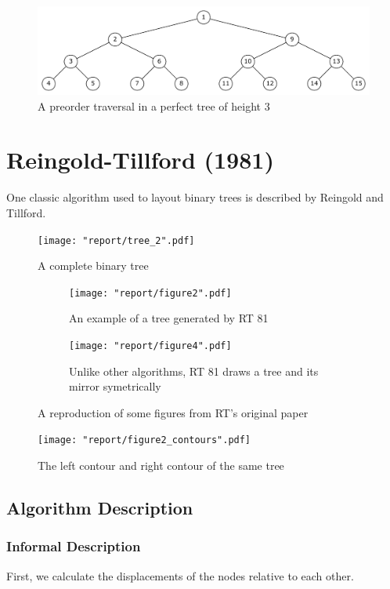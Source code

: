 \documentclass[11pt]{report}
\begin{document}
\begin{figure}[H]
    \includegraphics[width=\linewidth]{report/preorder.pdf}
    \caption{A preorder traversal in a perfect tree of height 3}
\end{figure}

\iffalse
\section{Reingold-Tillford (1981)}
One classic algorithm used to layout binary trees is described by Reingold and Tillford. 

\begin{figure}[H]
    \texttt{[image: "report/tree\_2".pdf]}
    \caption{A complete binary tree}
\end{figure}

\begin{figure}[H]
    \centering
    \begin{subfigure}{.5\textwidth}
        \centering
        \texttt{[image: "report/figure2".pdf]}
        \caption{An example of a tree generated by RT 81}
        \label{fig:fig2}
    \end{subfigure}%
    \begin{subfigure}{.5\textwidth}
        \centering
        \texttt{[image: "report/figure4".pdf]}
        \caption{Unlike other algorithms, RT 81 draws a tree and its mirror symetrically}
    \end{subfigure}%
    
    \caption{A reproduction of some figures from RT's original paper}
\end{figure}

\begin{figure}[H]
    \texttt{[image: "report/figure2\_contours".pdf]}
    \caption{The left contour and right contour of the same tree}
\end{figure}

\subsection{Algorithm Description}
\subsubsection{Informal Description}
First, we calculate the displacements of the nodes relative to each other.
\end{document}
